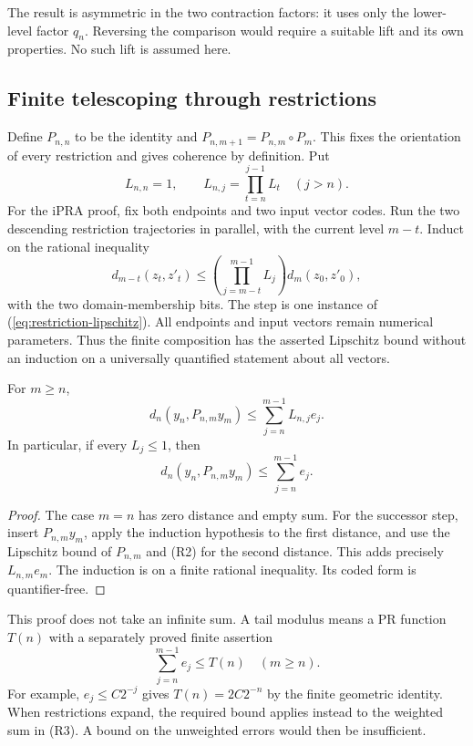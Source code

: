 The result is asymmetric in the two contraction factors: it uses only
the lower-level factor \(q_n\). Reversing the comparison would require
a suitable lift and its own properties. No such lift is assumed here.

\subsection{Finite telescoping through restrictions}

Define \(P_{n,n}\) to be the identity and
\(P_{n,m+1}=P_{n,m}\circ P_m\). This fixes the orientation of every
restriction and gives coherence by definition. Put
\[
 L_{n,n}=1,\qquad L_{n,j}=\prod_{t=n}^{j-1}L_t\quad(j>n).
\]
For the iPRA proof, fix both endpoints and two input vector codes.
Run the two descending restriction trajectories in parallel, with the
current level \(m-t\). Induct on the rational inequality
\[
 d_{m-t}(z_t,z'_t)\le
 \left(\prod_{j=m-t}^{m-1}L_j\right)d_m(z_0,z'_0),
\]
with the two domain-membership bits. The step is one instance of (\ref{eq:restriction-lipschitz}).
All endpoints and input vectors remain numerical parameters. Thus the
finite composition has the asserted Lipschitz bound without an induction
on a universally quantified statement about all vectors.

\begin{theorem}
\label{thm:finite-refinement}
For \(m\ge n\),
\[
 d_n(y_n,P_{n,m}y_m)
 \le\sum_{j=n}^{m-1}L_{n,j}e_j.
 \label{eq:refinement-sum}\tag{R3}
\]
In particular, if every \(L_j\le1\), then
\[
 d_n(y_n,P_{n,m}y_m)\le\sum_{j=n}^{m-1}e_j.
\]
\end{theorem}
\begin{proof}
The case \(m=n\) has zero distance and empty sum. For the successor
step, insert \(P_{n,m}y_m\), apply the induction hypothesis to the
first distance, and use the Lipschitz bound of \(P_{n,m}\) and (R2)
for the second distance. This adds precisely \(L_{n,m}e_m\).
The induction is on a finite rational inequality. Its coded form is
quantifier-free.
\end{proof}

This proof does not take an infinite sum. A tail modulus means a PR
function \(T(n)\) with a separately proved finite assertion
\[
 \sum_{j=n}^{m-1}e_j\le T(n)\quad(m\ge n).
 \label{eq:finite-tail}\tag{R4}
\]
For example, \(e_j\le C2^{-j}\) gives \(T(n)=2C2^{-n}\) by the
finite geometric identity. When restrictions expand, the required
bound applies instead to the weighted sum in (R3). A bound on the
unweighted errors would then be insufficient.

